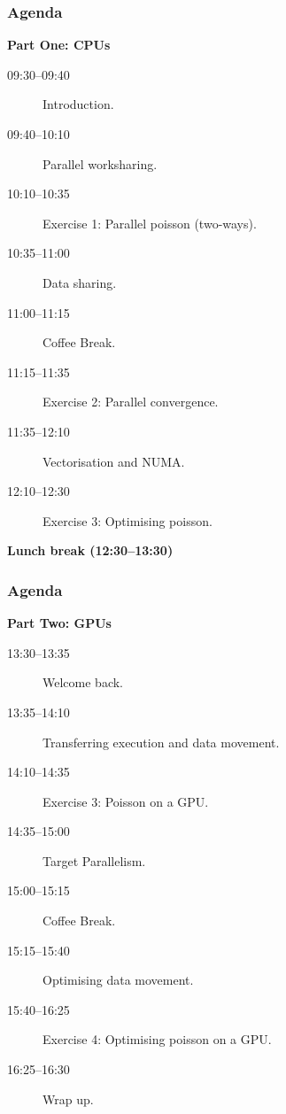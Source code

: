 \documentclass[aspectratio=169]{beamer}
\begin{document}


\begin{frame}
\frametitle{Agenda}

\textbf{Part One: CPUs}
\begin{description}
  \item[09:30--09:40] Introduction.
  \item[09:40--10:10] Parallel worksharing.
  \item[10:10--10:35] Exercise 1: Parallel poisson (two-ways).
  \item[10:35--11:00] Data sharing.
  \item[11:00--11:15] Coffee Break.
  \item[11:15--11:35] Exercise 2: Parallel convergence.
  \item[11:35--12:10] Vectorisation and NUMA.
  \item[12:10--12:30] Exercise 3: Optimising poisson.
\end{description}

\textbf{Lunch break (12:30--13:30)}
\end{frame}

\begin{frame}
\frametitle{Agenda}
\textbf{Part Two: GPUs}
\begin{description}
  \item[13:30--13:35] Welcome back.
  \item[13:35--14:10] Transferring execution and data movement.
  \item[14:10--14:35] Exercise 3: Poisson on a GPU.
  \item[14:35--15:00] Target Parallelism.
  \item[15:00--15:15] Coffee Break.
  \item[15:15--15:40] Optimising data movement.
  \item[15:40--16:25] Exercise 4: Optimising poisson on a GPU. 
  \item[16:25--16:30] Wrap up.
\end{description}
\end{frame}


\end{document}
